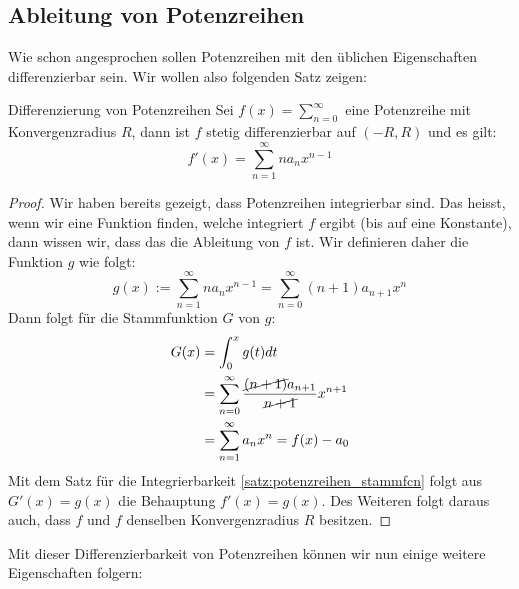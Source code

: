\subsection{Ableitung von Potenzreihen}
Wie schon angesprochen sollen Potenzreihen mit den üblichen Eigenschaften differenzierbar sein. Wir wollen also folgenden Satz zeigen:
\begin{satz}{Differenzierung von Potenzreihen}{}
Sei $f(x) = \sum_{n=0}^\infty$ eine Potenzreihe mit Konvergenzradius $R$, dann ist $f$ stetig differenzierbar auf $(-R,R)$ und es gilt:
$$f'(x) = \sum^\infty_{n=1} na_nx^{n-1}$$
\end{satz}
\begin{proof}
Wir haben bereits gezeigt, dass Potenzreihen integrierbar sind. Das heisst, wenn wir eine Funktion finden, welche integriert $f$ ergibt (bis auf eine Konstante), dann wissen wir, dass das die Ableitung von $f$ ist. Wir definieren daher die Funktion $g$ wie folgt:
$$g(x):=\sum_{n=1}^\infty n a_n x^{n-1} = \sum_{n=0}^\infty (n+1) a_{n+1} x^n$$
Dann folgt für die Stammfunktion $G$ von $g$:
\begin{align*}
    G(x) &= \int_0^x g(t) dt\\
        &= \sum_{n=0}^\infty \frac{\cancel{(n+1)}a_{n+1}}{\cancel{n+1}}x^{n+1}\\
        &= \sum_{n=1}^\infty a_nx^n = f(x) - a_0
\end{align*}
Mit dem Satz für die Integrierbarkeit \ref{satz:potenzreihen_stammfcn} folgt aus $G'(x) = g(x)$ die Behauptung $f'(x) = g(x)$. Des Weiteren folgt daraus auch, dass $f$ und $f$ denselben Konvergenzradius $R$ besitzen.
\end{proof}

Mit dieser Differenzierbarkeit von Potenzreihen können wir nun einige weitere Eigenschaften folgern:

